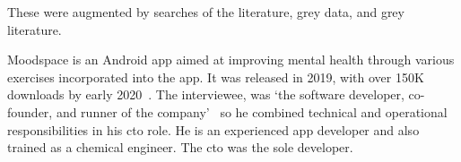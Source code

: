 These were augmented by searches of the literature, grey data, and grey literature.

Moodspace is an Android app aimed at improving mental health through various exercises incorporated into the app. %
It was released in 2019, with over 150K downloads by early 2020~. The interviewee, was `the software developer, co-founder, and runner of the company'~ so he combined technical and operational responsibilities in his \Gls{cto} role. He is an experienced app developer and also trained as a chemical engineer. The \Gls{cto} was the sole developer. 

